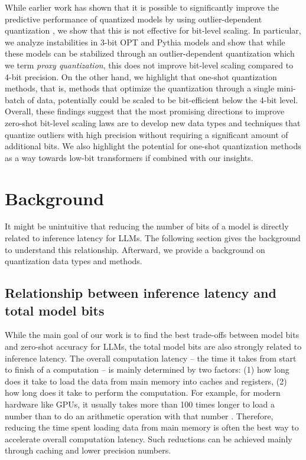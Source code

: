 While earlier work has shown that it is possible to significantly improve the predictive performance of quantized models by using outlier-dependent quantization \citep{dettmers2022llm,xiao2022smoothquant}, we show that this is not effective for bit-level scaling. In particular, we analyze instabilities in 3-bit OPT and Pythia models and show that while these models can be stabilized through an outlier-dependent quantization which we term {\it proxy quantization}, this does not improve bit-level scaling compared to 4-bit precision. On the other hand, we highlight that one-shot quantization methods, that is, methods that optimize the quantization through a single mini-batch of data, potentially could be scaled to be bit-efficient below the 4-bit level. Overall, these findings suggest that the most promising directions to improve zero-shot bit-level scaling laws are to develop new data types and techniques that quantize outliers with high precision without requiring a significant amount of additional bits. We also highlight the potential for one-shot quantization methods as a way towards low-bit transformers if combined with our insights.

\section{Background}

It might be unintuitive that reducing the number of bits of a model is directly related to inference latency for LLMs. The following section gives the background to understand this relationship. Afterward, we provide a background on quantization data types and methods.

\subsection{Relationship between inference latency and total model bits}
\label{lbl:inference-latency-bits}

While the main goal of our work is to find the best trade-offs between model bits and zero-shot accuracy for LLMs, the total model bits are also strongly related to inference latency. The overall computation latency -- the time it takes from start to finish of a computation -- is mainly determined by two factors: (1) how long does it take to load the data from main memory into caches and registers, (2) how long does it take to perform the computation. For example, for modern hardware like GPUs, it usually takes more than 100 times longer to load a number than to do an arithmetic operation with that number \citep{jia2019dissecting, dongarra2022}. Therefore, reducing the time spent loading data from main memory is often the best way to accelerate overall computation latency. Such reductions can be achieved mainly through caching and lower precision numbers.

